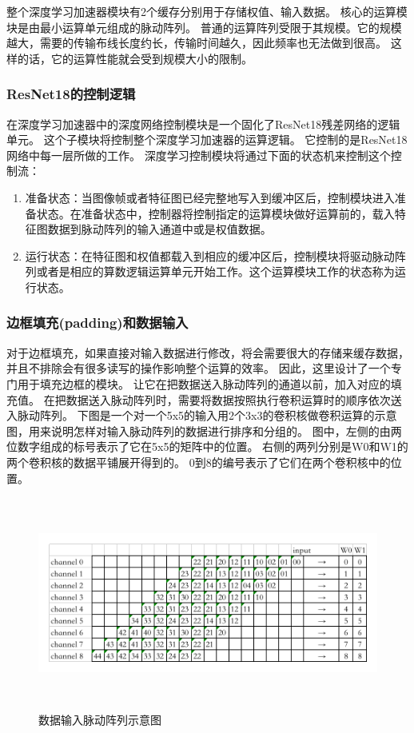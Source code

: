 整个深度学习加速器模块有2个缓存分别用于存储权值、输入数据。
核心的运算模块是由最小运算单元组成的脉动阵列。
普通的运算阵列受限于其规模。它的规模越大，需要的传输布线长度约长，传输时间越久，因此频率也无法做到很高。
这样的话，它的运算性能就会受到规模大小的限制。



\subsubsection{ResNet18的控制逻辑}
在深度学习加速器中的深度网络控制模块是一个固化了ResNet18残差网络的逻辑单元。
这个子模块将控制整个深度学习加速器的运算逻辑。
它控制的是ResNet18网络中每一层所做的工作。
深度学习控制模块将通过下面的状态机来控制这个控制流：
\begin{enumerate}
    \item 准备状态：当图像帧或者特征图已经完整地写入到缓冲区后，控制模块进入准备状态。在准备状态中，控制器将控制指定的运算模块做好运算前的，载入特征图数据到脉动阵列的输入通道中或是权值数据。
    \item 运行状态：在特征图和权值都载入到相应的缓冲区后，控制模块将驱动脉动阵列或者是相应的算数逻辑运算单元开始工作。这个运算模块工作的状态称为运行状态。
\end{enumerate}  



\subsubsection{边框填充(padding)和数据输入}
对于边框填充，如果直接对输入数据进行修改，将会需要很大的存储来缓存数据，并且不排除会有很多读写的操作影响整个运算的效率。
因此，这里设计了一个专门用于填充边框的模块。
让它在把数据送入脉动阵列的通道以前，加入对应的填充值。
在把数据送入脉动阵列时，需要将数据按照执行卷积运算时的顺序依次送入脉动阵列。
下图是一个对一个5x5的输入用2个3x3的卷积核做卷积运算的示意图，用来说明怎样对输入脉动阵列的数据进行排序和分组的。
图中，左侧的由两位数字组成的标号表示了它在5x5的矩阵中的位置。
右侧的两列分别是W0和W1的两个卷积核的数据平铺展开得到的。
0到8的编号表示了它们在两个卷积核中的位置。

\begin{figure}[htbp]
    \centering
    \includegraphics[width=15cm,height=7cm]{figures/input_systolic_array.png}
    \caption{数据输入脉动阵列示意图}
    \label{systolic}
\end{figure}


